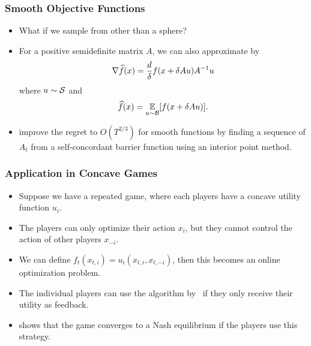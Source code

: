 \documentclass{beamer}
\begin{document}
\begin{frame}
    \frametitle{Smooth Objective Functions~\citep{saha2011improved}}
    \begin{itemize}
        \item What if we sample from other than a sphere?
        \item For a positive semidefinite matrix $A$, we can also approximate by
        \[
            \nabla \widehat{f}(x) = \frac{d}{\delta}f(x + \delta A u)A^{-1}u
        \]
        where $u \sim \mathcal{S}$ and
        \[
            \widehat{f}(x) = \operatorname*{\mathbb{E}}_{u \sim \mathcal{B}}[f(x + \delta Au)].
        \]
        \item \cite{saha2011improved} improve the regret to $O(T^{2/3})$ for smooth functions by finding a sequence of $A_t$ from a self-concordant barrier function using an interior point method.
    \end{itemize}
\end{frame}

\begin{frame}
    \frametitle{Application in Concave Games~\citep{bravo2018bandit}}
    \begin{itemize}
        \item Suppose we have a repeated game, where each players have a concave utility function $u_i$.
        \item The players can only optimize their action $x_i$, but they cannot control the action of other players $x_{-i}$.
        \item We can define $f_t(x_{t,i}) = u_i(x_{t,i}, x_{t,-i})$, then this becomes an online optimization problem.
        \item The individual players can use the algorithm by~\cite{flaxman2005online} if they only receive their utility as feedback.
        \item \cite{bravo2018bandit} shows that the game converges to a Nash equilibrium if the players use this strategy.
    \end{itemize}
\end{frame}



\end{document}
